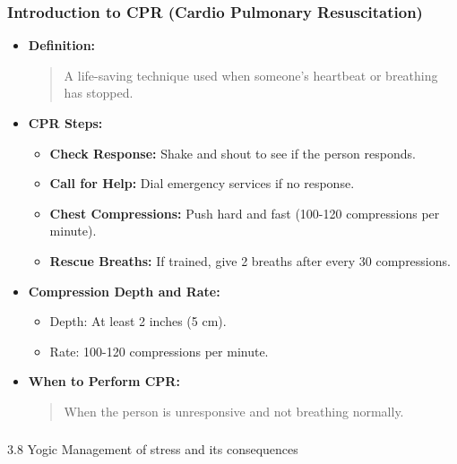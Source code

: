 \begin{frame}[fragile]\frametitle{Introduction to CPR (Cardio Pulmonary Resuscitation)}

      \begin{itemize}
        \item \textbf{Definition:} 
        \begin{quote}
        A life-saving technique used when someone’s heartbeat or breathing has stopped.
        \end{quote}
        \item \textbf{CPR Steps:} 
        \begin{itemize}
            \item \textbf{Check Response:} Shake and shout to see if the person responds.
            \item \textbf{Call for Help:} Dial emergency services if no response.
            \item \textbf{Chest Compressions:} Push hard and fast (100-120 compressions per minute).
            \item \textbf{Rescue Breaths:} If trained, give 2 breaths after every 30 compressions.
        \end{itemize}
        \item \textbf{Compression Depth and Rate:} 
        \begin{itemize}
            \item Depth: At least 2 inches (5 cm).
            \item Rate: 100-120 compressions per minute.
        \end{itemize}
        \item \textbf{When to Perform CPR:} 
        \begin{quote}
        When the person is unresponsive and not breathing normally.
        \end{quote}
      \end{itemize}

\end{frame}

\begin{frame}[fragile]\frametitle{}
\begin{center}
{\Large 3.8 Yogic Management of stress and its consequences}
\end{center}
\end{frame}

